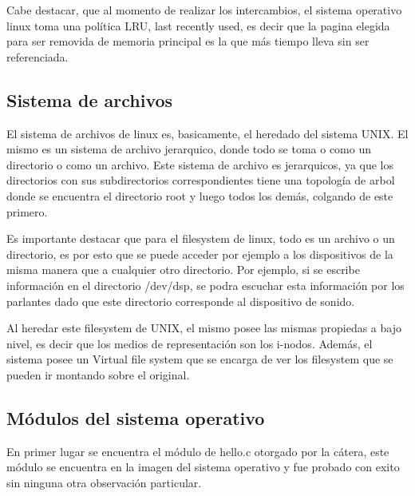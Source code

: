 \documentclass[a4paper, 12pt]{article}
\begin{document}
Cabe destacar, que al momento de realizar los intercambios, el sistema operativo linux toma una pol\'itica LRU, last recently used, es decir que la pagina elegida para ser removida de memoria principal es la que m\'as tiempo lleva sin ser referenciada.

\subsection*{Sistema de archivos}

El sistema de archivos de linux es, basicamente, el heredado del sistema UNIX. El mismo es un sistema de archivo jerarquico, donde todo se toma o como un directorio o como un archivo. Este sistema de archivo es jerarquicos, ya que los directorios con sus subdirectorios correspondientes tiene una topolog\'ia de arbol donde se encuentra el directorio root y luego todos los dem\'as, colgando de este primero. 

Es importante destacar que para el filesystem de linux, todo es un archivo o un directorio, es por esto que se puede acceder por ejemplo a los dispositivos de la misma manera que a cualquier otro directorio. Por ejemplo, si se escribe informaci\'on en el directorio /dev/dsp, se podra escuchar esta informaci\'on por los parlantes dado que este directorio corresponde al dispositivo de sonido.

Al heredar este filesystem de UNIX, el mismo posee las mismas propiedas a bajo nivel, es decir que los medios de representaci\'on son los i-nodos. Adem\'as, el sistema posee un Virtual file system que se encarga de ver los filesystem que se pueden ir montando sobre el original. 


\subsection*{M\'odulos del sistema operativo}

En primer lugar se encuentra el m\'odulo de hello.c otorgado por la c\'atera, este m\'odulo se encuentra en la imagen del sistema operativo y fue probado con exito sin ninguna otra observaci\'on particular.

\bigskip
\end{document}
